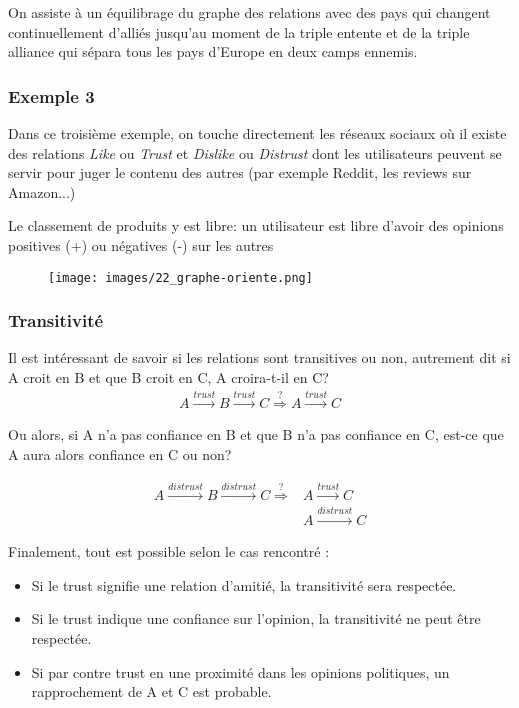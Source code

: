 On assiste à un équilibrage du graphe des relations avec des pays qui changent continuellement d'alliés jusqu'au moment de la triple entente et de la triple alliance qui sépara tous les pays d'Europe en deux camps ennemis.

\subsubsection*{Exemple 3}
Dans ce troisième exemple, on touche directement les réseaux sociaux où il existe des relations \textit{Like} ou \textit{Trust} et \textit{Dislike} ou \textit{Distrust} dont les utilisateurs peuvent se servir pour juger le contenu des autres (par exemple Reddit, les reviews sur Amazon...)

Le classement de produits y est libre: un utilisateur est libre d'avoir des opinions positives (+) ou négatives (-) sur les autres

\begin{figure}[!h]
	\centering
	\texttt{[image: images/22\_graphe-oriente.png]}
\end{figure}

\subsubsection*{Transitivité}  

Il est intéressant de savoir si les relations sont transitives ou non, autrement dit si A croit en B et que B croit en C, A croira-t-il en C?
\begin{align*}
A \overset{trust}{\longrightarrow} B \overset{trust}{\longrightarrow} C \overset{?}{\Longrightarrow} A \overset{trust}{\longrightarrow} C
\end{align*}

Ou alors, si A n'a pas confiance en B et que B n'a pas confiance en C, est-ce que A aura alors confiance en C ou non?


\begin{align*}
A \overset{distrust}{\longrightarrow} B \overset{distrust}{\longrightarrow} C \overset{?}{\Longrightarrow} &A \overset{trust}{\longrightarrow} C\\
&A \overset{distrust}{\longrightarrow} C
\end{align*}

Finalement, tout est possible selon le cas rencontré : 
\begin{itemize}
\item Si le trust signifie une relation d'amitié, la transitivité sera respectée. 
\item Si le trust indique une confiance sur l’opinion, la transitivité ne peut être respectée. 
\item Si par contre trust en une proximité dans les opinions politiques, un rapprochement de A et C est probable. 
\end{itemize}


